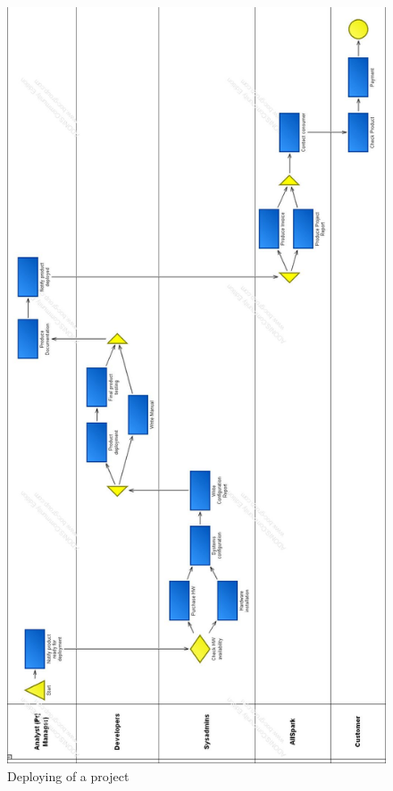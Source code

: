 \begin{figure}
\centering
\includegraphics[scale=0.27]{adonis_diagrams/deploy}
\caption{Deploying of a project}
\label{img:deploy}
\end{figure}
